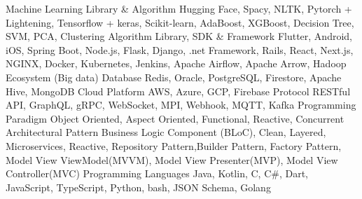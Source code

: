 
\horizontalLineRight

\skillItem
    {Machine Learning Library \& Algorithm}
    {Hugging Face, Spacy, NLTK, Pytorch + Lightening, Tensorflow + keras, Scikit-learn, AdaBoost, XGBoost, Decision Tree, SVM, PCA, Clustering Algorithm}
\skillItem
    {Library, SDK \& Framework}
    {Flutter, Android, iOS, Spring Boot, Node.js, Flask,
        Django, .net Framework, Rails,
        React, Next.js, NGINX, Docker, Kubernetes,
        Jenkins, Apache Airflow, Apache Arrow, Hadoop Ecosystem (Big data)}
\skillItem
    {Database}
    {Redis, Oracle, PostgreSQL, Firestore, Apache Hive, MongoDB}
\skillItem
    {Cloud Platform}
    {AWS, Azure, GCP, Firebase}
\skillItem
    {Protocol}
    {RESTful API, GraphQL, gRPC, WebSocket, MPI, Webhook, MQTT, Kafka}
\skillItem
    {Programming Paradigm}
    {Object Oriented, Aspect Oriented, Functional, Reactive, Concurrent}
\skillItem
    {Architectural Pattern}
    {Business Logic Component (BLoC), Clean, Layered, Microservices, Reactive, Repository Pattern,Builder Pattern,
        Factory Pattern, Model View ViewModel(MVVM), Model View Presenter(MVP), Model View Controller(MVC)}
\skillItem
    {Programming Languages}
    {Java, Kotlin, C, C\#, Dart, JavaScript, TypeScript, Python, bash, JSON Schema, Golang}